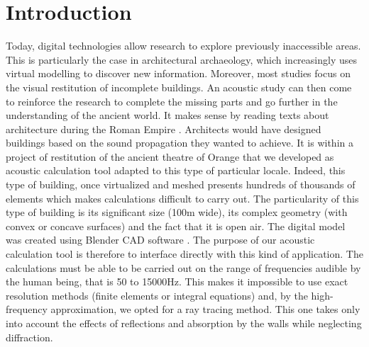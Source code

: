 \documentclass[AMA,STIX1COL]{WileyNJD-v2}
\begin{document}

\maketitle


%

\section{Introduction}\label{sec1}
Today, digital technologies allow research to explore previously inaccessible areas. This is particularly the case in architectural archaeology, which increasingly uses virtual modelling to discover new information. Moreover, most studies focus on the visual restitution of incomplete buildings. An acoustic study can then come to reinforce the research to complete the missing parts and go further in the understanding of the ancient world. It makes sense by reading texts about architecture during the Roman Empire \cite{vitruve}. Architects would have designed buildings based on the sound propagation they wanted to achieve. 
It is within a project of restitution of the ancient theatre of Orange that we developed as acoustic calculation tool adapted to this type of particular locale. Indeed, this type of building, once virtualized and meshed presents hundreds of thousands of elements which makes calculations difficult to carry out. The particularity of this type of building is its significant size (100m wide), its complex geometry (with convex or concave surfaces) and the fact that it is open air. The digital model was created using Blender CAD software \cite{theseRobin}. The purpose of our acoustic calculation tool is therefore to interface directly with this kind of application. The calculations must be able to be carried out on the range of frequencies audible by the human being, that is 50 to 15000Hz. This makes it impossible to use exact resolution methods (finite elements or integral equations) and, by the high-frequency approximation, we opted for a ray tracing method. This one takes only into account the effects of reflections and absorption by the walls while neglecting diffraction.
\end{document}
